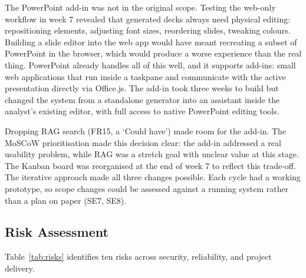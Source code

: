 The PowerPoint add-in was not in the original scope. Testing the web-only workflow in week 7 revealed that generated decks always need physical editing: repositioning elements, adjusting font sizes, reordering slides, tweaking colours. Building a slide editor into the web app would have meant recreating a subset of PowerPoint in the browser, which would produce a worse experience than the real thing. PowerPoint already handles all of this well, and it supports add-ins: small web applications that run inside a taskpane and communicate with the active presentation directly via Office.js. The add-in took three weeks to build but changed the system from a standalone generator into an assistant inside the analyst's existing editor, with full access to native PowerPoint editing tools.

Dropping RAG search (FR15, a `Could have') made room for the add-in. The MoSCoW prioritisation made this decision clear: the add-in addressed a real usability problem, while RAG was a stretch goal with unclear value at this stage. The Kanban board was reorganised at the end of week 7 to reflect this trade-off. The iterative approach made all three changes possible. Each cycle had a working prototype, so scope changes could be assessed against a running system rather than a plan on paper (SE7, SE8).

\subsection{Risk Assessment}

Table~\ref{tab:risks} identifies ten risks across security, reliability, and project delivery.

